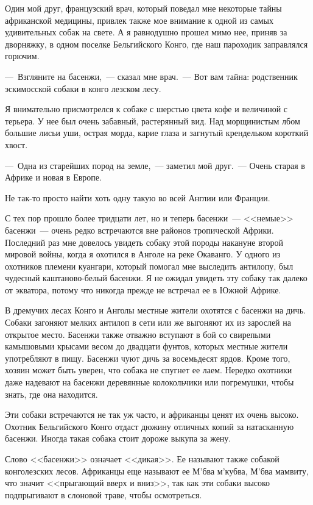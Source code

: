 \documentclass[12pt,a4paper,twoside,openany,svgnames]{memoir}
\begin{document}
Один мой друг, французский врач, который поведал мне некоторые тайны африканской медицины, привлек также мое внимание к одной из самых удивительных собак на свете. А я равнодушно прошел мимо нее, приняв за дворняжку, в одном поселке Бельгийского Конго, где наш пароходик заправлялся горючим.

---~Взгляните на басенжи,~--- сказал мне врач.~--- Вот вам тайна: родственник эскимосской собаки в конго лезском лесу.

Я внимательно присмотрелся к собаке с шерстью цвета кофе и величиной с терьера. У нее был очень забавный, растерянный вид. Над морщинистым лбом большие лисьи уши, острая морда, карие глаза и загнутый крендельком короткий хвост.

---~Одна из старейших пород на земле,~--- заметил мой друг.~--- Очень старая в Африке и новая в Европе.

Не так-то просто найти хоть одну такую во всей Англии или Франции.

С тех пор прошло более тридцати лет, но и теперь басенжи~--- <<немые>> басенжи~--- очень редко встречаются вне районов тропической Африки. Последний раз мне довелось увидеть собаку этой породы накануне второй мировой войны, когда я охотился в Анголе на реке Окаванго. У одного из охотников племени куангари, который помогал мне выследить антилопу, был чудесный каштаново-белый басенжи. Я не ожидал увидеть эту собаку так далеко от экватора, потому что никогда прежде не встречал ее в Южной Африке.

В дремучих лесах Конго и Анголы местные жители охотятся с басенжи на дичь. Собаки загоняют мелких антилоп в сети или же выгоняют их из зарослей на открытое место. Басенжи также отважно вступают в бой со свирепыми камышовыми крысами весом до двадцати фунтов, которых местные жители употребляют в пищу. Басенжи чуют дичь за восемьдесят ярдов. Кроме того, хозяин может быть уверен, что собака не спугнет ее лаем. Нередко охотники даже надевают на басенжи деревянные колокольчики или погремушки, чтобы знать, где она находится.

Эти собаки встречаются не так уж часто, и африканцы ценят их очень высоко. Охотник Бельгийского Конго отдаст дюжину отличных копий за натасканную басенжи. Иногда такая собака стоит дороже выкупа за жену.

Слово <<басенжи>> означает <<дикая>>. Ее называют также собакой конголезских лесов. Африканцы еще называют ее М'бва м'кубва, М'бва мамвиту, что значит <<прыгающий вверх и вниз>>, так как эти собаки высоко подпрыгивают в слоновой траве, чтобы осмотреться.
\end{document}
